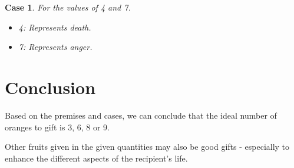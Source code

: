 \documentclass[10pt,a4paper]{article}
\newtheorem{case}[theorem]{Case}
\begin{document}
\begin{case}
    For the values of 4 and 7.

    \begin{itemize}
        \item 4: Represents death.
        \item 7: Represents anger.
    \end{itemize}
\end{case}

\section{Conclusion}
Based on the premises and cases, we can conclude that the ideal number of oranges to gift is 3, 6, 8 or 9.

Other fruits given in the given quantities may also be good gifts - especially to enhance the different aspects of the recipient's life.
\end{document}
